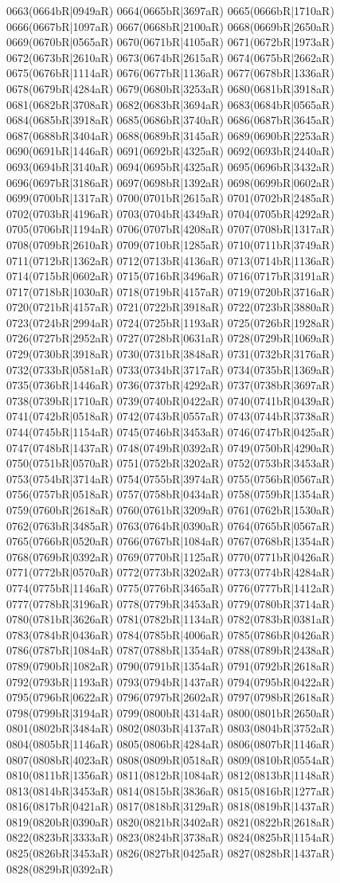 0663(0664bR|0949aR) 0664(0665bR|3697aR) 0665(0666bR|1710aR) 0666(0667bR|1097aR) 0667(0668bR|2100aR) 0668(0669bR|2650aR) 0669(0670bR|0565aR) 0670(0671bR|4105aR) 0671(0672bR|1973aR) 0672(0673bR|2610aR) 0673(0674bR|2615aR) 0674(0675bR|2662aR) 0675(0676bR|1114aR) 0676(0677bR|1136aR) 0677(0678bR|1336aR) 0678(0679bR|4284aR) 0679(0680bR|3253aR) 0680(0681bR|3918aR) 0681(0682bR|3708aR) 0682(0683bR|3694aR) 0683(0684bR|0565aR) 0684(0685bR|3918aR) 0685(0686bR|3740aR) 0686(0687bR|3645aR) 0687(0688bR|3404aR) 0688(0689bR|3145aR) 0689(0690bR|2253aR) 0690(0691bR|1446aR) 0691(0692bR|4325aR) 0692(0693bR|2440aR) 0693(0694bR|3140aR) 0694(0695bR|4325aR) 0695(0696bR|3432aR) 0696(0697bR|3186aR) 0697(0698bR|1392aR) 0698(0699bR|0602aR) 0699(0700bR|1317aR) 0700(0701bR|2615aR) 0701(0702bR|2485aR) 0702(0703bR|4196aR) 0703(0704bR|4349aR) 0704(0705bR|4292aR) 0705(0706bR|1194aR) 0706(0707bR|4208aR) 0707(0708bR|1317aR) 0708(0709bR|2610aR) 0709(0710bR|1285aR) 0710(0711bR|3749aR) 0711(0712bR|1362aR) 0712(0713bR|4136aR) 0713(0714bR|1136aR) 0714(0715bR|0602aR) 0715(0716bR|3496aR) 0716(0717bR|3191aR) 0717(0718bR|1030aR) 0718(0719bR|4157aR) 0719(0720bR|3716aR) 0720(0721bR|4157aR) 0721(0722bR|3918aR) 0722(0723bR|3880aR) 0723(0724bR|2994aR) 0724(0725bR|1193aR) 0725(0726bR|1928aR) 0726(0727bR|2952aR) 0727(0728bR|0631aR) 0728(0729bR|1069aR) 0729(0730bR|3918aR) 0730(0731bR|3848aR) 0731(0732bR|3176aR) 0732(0733bR|0581aR) 0733(0734bR|3717aR) 0734(0735bR|1369aR) 0735(0736bR|1446aR) 0736(0737bR|4292aR) 0737(0738bR|3697aR) 0738(0739bR|1710aR) 0739(0740bR|0422aR) 0740(0741bR|0439aR) 0741(0742bR|0518aR) 0742(0743bR|0557aR) 0743(0744bR|3738aR) 0744(0745bR|1154aR) 0745(0746bR|3453aR) 0746(0747bR|0425aR) 0747(0748bR|1437aR) 0748(0749bR|0392aR) 0749(0750bR|4290aR) 0750(0751bR|0570aR) 0751(0752bR|3202aR) 0752(0753bR|3453aR) 0753(0754bR|3714aR) 0754(0755bR|3974aR) 0755(0756bR|0567aR) 0756(0757bR|0518aR) 0757(0758bR|0434aR) 0758(0759bR|1354aR) 0759(0760bR|2618aR) 0760(0761bR|3209aR) 0761(0762bR|1530aR) 0762(0763bR|3485aR) 0763(0764bR|0390aR) 0764(0765bR|0567aR) 0765(0766bR|0520aR) 0766(0767bR|1084aR) 0767(0768bR|1354aR) 0768(0769bR|0392aR) 0769(0770bR|1125aR) 0770(0771bR|0426aR) 0771(0772bR|0570aR) 0772(0773bR|3202aR) 0773(0774bR|4284aR) 0774(0775bR|1146aR) 0775(0776bR|3465aR) 0776(0777bR|1412aR) 0777(0778bR|3196aR) 0778(0779bR|3453aR) 0779(0780bR|3714aR) 0780(0781bR|3626aR) 0781(0782bR|1134aR) 0782(0783bR|0381aR) 0783(0784bR|0436aR) 0784(0785bR|4006aR) 0785(0786bR|0426aR) 0786(0787bR|1084aR) 0787(0788bR|1354aR) 0788(0789bR|2438aR) 0789(0790bR|1082aR) 0790(0791bR|1354aR) 0791(0792bR|2618aR) 0792(0793bR|1193aR) 0793(0794bR|1437aR) 0794(0795bR|0422aR) 0795(0796bR|0622aR) 0796(0797bR|2602aR) 0797(0798bR|2618aR) 0798(0799bR|3194aR) 0799(0800bR|4314aR) 0800(0801bR|2650aR) 0801(0802bR|3484aR) 0802(0803bR|4137aR) 0803(0804bR|3752aR) 0804(0805bR|1146aR) 0805(0806bR|4284aR) 0806(0807bR|1146aR) 0807(0808bR|4023aR) 0808(0809bR|0518aR) 0809(0810bR|0554aR) 0810(0811bR|1356aR) 0811(0812bR|1084aR) 0812(0813bR|1148aR) 0813(0814bR|3453aR) 0814(0815bR|3836aR) 0815(0816bR|1277aR) 0816(0817bR|0421aR) 0817(0818bR|3129aR) 0818(0819bR|1437aR) 0819(0820bR|0390aR) 0820(0821bR|3402aR) 0821(0822bR|2618aR) 0822(0823bR|3333aR) 0823(0824bR|3738aR) 0824(0825bR|1154aR) 0825(0826bR|3453aR) 0826(0827bR|0425aR) 0827(0828bR|1437aR) 0828(0829bR|0392aR) 